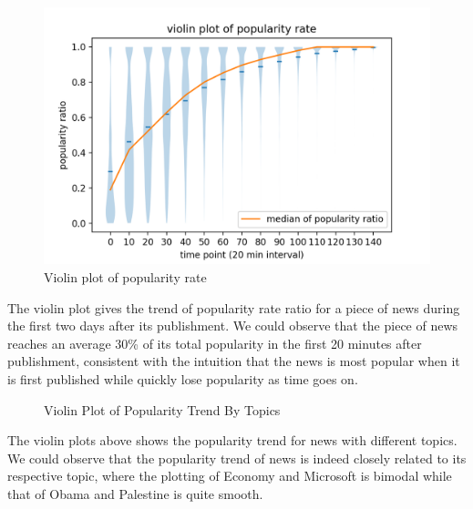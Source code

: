 \documentclass{article}
\begin{document}
\begin{figure}[H]
\centering
\includegraphics[scale=0.45]{"violin plot of popularity rate"}
\caption{Violin plot of popularity rate}
\end{figure}

The violin plot gives the trend of popularity rate ratio for a piece of news during the first two days after its publishment. We could observe that the piece of news reaches an average 30\% of its total popularity in the first 20 minutes after publishment, consistent with the intuition that the news is most popular when it is first published while quickly lose popularity as time goes on.

\begin{figure}[H]
    \centering
    \caption{Violin Plot of Popularity Trend By Topics}
\end{figure}

The violin plots above shows the popularity trend for news with different topics. We could observe that the popularity trend of news is indeed closely related to its respective topic, where the plotting of Economy and Microsoft is bimodal while that of Obama and Palestine is quite smooth.
\end{document}
